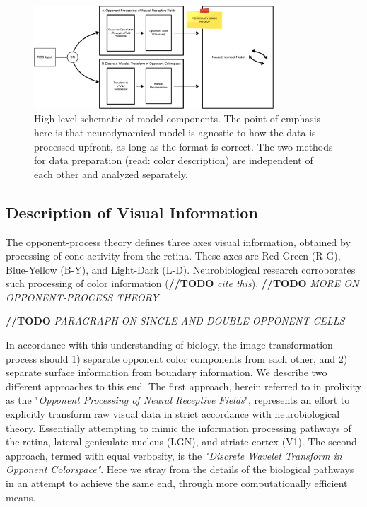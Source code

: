 \documentclass[journal,onecolumn]{IEEEtran}
\begin{document}
\begin{figure}[H]
    \centering
    \includegraphics[width=0.8\textwidth]{model1_mockup}
    \caption{High level schematic of model components. The point of emphasis here is that neurodynamical model is agnostic to how the data is processed upfront, as long as the format is correct. The two methods for data preparation (read: color description) are independent of each other and analyzed separately.}
    \label{fig:model-parts}
\end{figure}

\subsection*{Description of Visual Information}

The opponent-process theory defines three axes visual information, obtained by processing of cone activity from the retina. These axes are Red-Green (R-G), Blue-Yellow (B-Y), and Light-Dark (L-D). Neurobiological research corroborates such processing of color information (\textbf{//TODO} \textit{cite this}). \textbf{//TODO} \textit{MORE ON OPPONENT-PROCESS THEORY}

\textbf{//TODO} \textit{PARAGRAPH ON SINGLE AND DOUBLE OPPONENT CELLS}

In accordance with this understanding of biology, the image transformation process should 1) separate opponent color components from each other, and 2) separate surface information from boundary information. We describe two different approaches to this end. The first approach, herein referred to in prolixity as the "\textit{Opponent Processing of Neural Receptive Fields}", represents an effort to explicitly transform raw visual data in strict accordance with neurobiological theory. Essentially attempting to mimic the information processing pathways of the retina, lateral geniculate nucleus (LGN), and striate cortex (V1). The second approach, termed with equal verbosity, is the \textit{"Discrete Wavelet Transform in Opponent Colorspace"}. Here we stray from the details of the biological pathways in an attempt to achieve the same end, through more computationally efficient means.
\end{document}
